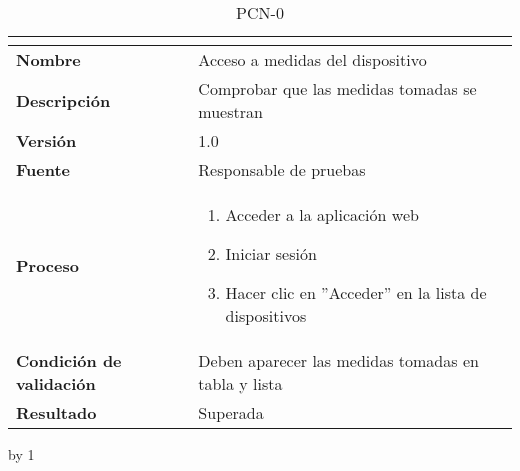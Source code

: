 \begin{table}[H]
	\caption{PCN-0\number\pcn}
	\begin{tabular}{|l|p{}|}
		\hline
		\multicolumn{2}{|c|}{\cellcolor[HTML]{BFBFBF}{\color[HTML]{000000} \textbf{PCN-0\number\pcn}}} \\ \hline
		\textbf{Nombre}                  & Acceso a medidas del dispositivo                    \\ \hline
		\textbf{Descripción}             & Comprobar que las medidas tomadas se muestran       \\ \hline
		\textbf{Versión}                 & 1.0                                                 \\ \hline
		\textbf{Fuente}                  & Responsable de pruebas                              \\ \hline
		\textbf{Proceso}                 & \begin{enumerate}
			\item Acceder a la aplicación web
			\item Iniciar sesión
			\item Hacer clic en ''Acceder'' en la lista de dispositivos
		\end{enumerate}                          \\ \hline		
		\textbf{Condición de validación} & Deben aparecer las medidas tomadas en tabla y lista \\ \hline
		\textbf{Resultado}               & Superada                                            \\ \hline
	\end{tabular}
\end{table}
\advance\pcn by 1
